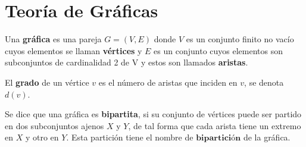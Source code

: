 \chapter{Teoría de Gráficas}

\begin{dfn}  
Una \textbf{gráfica} es una pareja $G = (V, E)$ donde $V$ es un conjunto finito no vacío
cuyos elementos se llaman \textbf{vértices} y $E$ es un conjunto cuyos elementos son subconjuntos de
cardinalidad 2 de V y estos son llamados \textbf{aristas}.
\end{dfn}

\begin{dfn}  
El \textbf{grado} de un vértice $v$ es el número de aristas que inciden en $v$, se denota $d(v)$.
\end{dfn}

\begin{dfn} 
Se dice que una gráfica es \textbf{bipartita}, si su conjunto de vértices puede ser partido en dos subconjuntos ajenos $X$ y $Y$, de tal forma que cada arista tiene un extremo en $X$ y otro en $Y$. Esta partición tiene el nombre de $\textbf{bipartición}$ de la gráfica.
\end{dfn}

